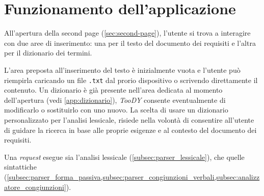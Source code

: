 \documentclass[12pt]{report}
\newcommand{\torevise}[1]{\textcolor{red}{#1}}
\newcommand{\toody}{\textsl{TooDY}\xspace}
\newcommand{\javascript}{\textsl{JavaScript}\xspace}
\newcommand{\api}{\textsf{API}\xspace}
\newcommand{\http}{\textsf{HTTP}\xspace}
\newcommand{\post}{\textsf{POST}\xspace}
\begin{document}
\section{Funzionamento dell'applicazione}
All'apertura della \textsf{second page} (\cref{sec:second-page}), l'utente si trova a interagire con due aree di inserimento: una per il testo del documento dei requisiti e l'altra per il dizionario dei termini.

L'area preposta all'inserimento del testo è inizialmente vuota e l'utente può riempirla caricando un file \texttt{.txt} dal prorio dispositivo o scrivendo direttamente il contenuto. Un dizionario è già presente nell'area dedicata al momento dell'apertura (vedi \cref{app:dizionario}), \toody consente eventualmente di modificarlo o sostituirlo con uno nuovo.
La scelta di usare un dizionario personalizzato per l'analisi lessicale, risiede nella volontà di consentire all'utente di guidare la ricerca in base alle proprie esigenze e al contesto del documento dei requisiti.

Una \textit{request} esegue sia l'analisi lessicale (\cref{subsec:parser_lessicale}), che quelle sintattiche (\cref{subsec:parser_forma_passiva,subsec:parser_congiunzioni_verbali,subsec:analizzatore_congiunzioni}).
\end{document}

